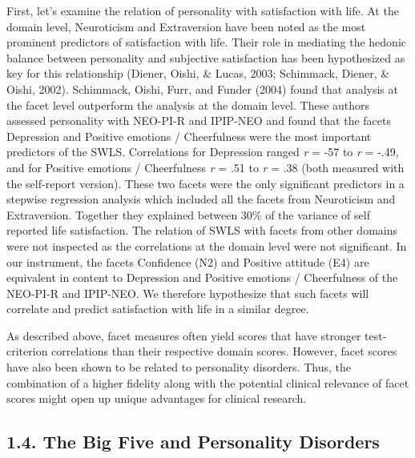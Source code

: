\documentclass[,man,floatsintext]{apa6}
\theoremstyle{definition}
\theoremstyle{definition}
\theoremstyle{definition}
\theoremstyle{remark}
\begin{document}
First, let's examine the relation of personality with satisfaction with
life. At the domain level, Neuroticism and Extraversion have been noted
as the most prominent predictors of satisfaction with life. Their role
in mediating the hedonic balance between personality and subjective
satisfaction has been hypothesized as key for this relationship (Diener,
Oishi, \& Lucas, 2003; Schimmack, Diener, \& Oishi, 2002). Schimmack,
Oishi, Furr, and Funder (2004) found that analysis at the facet level
outperform the analysis at the domain level. These authors assessed
personality with NEO-PI-R and IPIP-NEO and found that the facets
Depression and Positive emotions / Cheerfulness were the most important
predictors of the SWLS. Correlations for Depression ranged \emph{r} =
-57 to \emph{r} = -.49, and for Positive emotions / Cheerfulness
\emph{r} = .51 to \emph{r} = .38 (both measured with the self-report
version). These two facets were the only significant predictors in a
stepwise regression analysis which included all the facets from
Neuroticism and Extraversion. Together they explained between 30\% of
the variance of self reported life satisfaction. The relation of SWLS
with facets from other domains were not inspected as the correlations at
the domain level were not significant. In our instrument, the facets
Confidence (N2) and Positive attitude (E4) are equivalent in content to
Depression and Positive emotions / Cheerfulness of the NEO-PI-R and
IPIP-NEO. We therefore hypothesize that such facets will correlate and
predict satisfaction with life in a similar degree.

As described above, facet measures often yield scores that have stronger
test-criterion correlations than their respective domain scores.
However, facet scores have also been shown to be related to personality
disorders. Thus, the combination of a higher fidelity along with the
potential clinical relevance of facet scores might open up unique
advantages for clinical research.

\hypertarget{the-big-five-and-personality-disorders}{%
\subsection{1.4. The Big Five and Personality
Disorders}\label{the-big-five-and-personality-disorders}}
\end{document}
